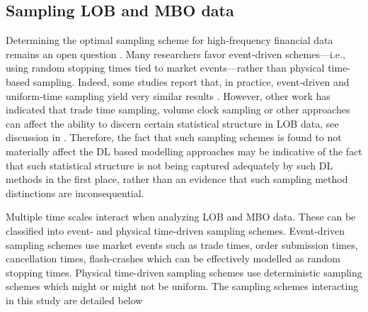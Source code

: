 \documentclass[10pt,a4paper,oneside]{article}
\begin{document}
\subsection{Sampling LOB and MBO data}
\label{SubSect:SampLOB}
Determining the optimal sampling scheme for high-frequency financial data remains an open question \cite{dutta2023review}.  Many researchers favor event‐driven schemes—i.e., using random stopping times tied to market events—rather than physical time-based sampling.  Indeed, some studies report that, in practice, event‐driven and uniform‐time sampling yield very similar results \cite{easley2021microstructure}. However, other work has indicated that trade time sampling, volume clock sampling or other approaches can affect the ability to discern certain statistical structure in LOB data, see discussion in \cite{koukorinis4959155memory}. Therefore, the fact that such sampling schemes is found to not materially affect the DL based modelling approaches may be indicative of the fact that such statistical structure is not being captured adequately by such DL methods in the first place, rather than an evidence that such sampling method distinctions are inconsequential.

Multiple time scales interact when analyzing LOB and MBO data. These can be classified into event- and physical time-driven sampling schemes. Event-driven sampling schemes use market events such as trade times, order submission times, cancellation times, flash-crashes which can be effectively modelled as random stopping times. Physical time-driven sampling schemes use deterministic sampling schemes which might or might not be uniform. The sampling schemes interacting in this study are detailed below
\end{document}
